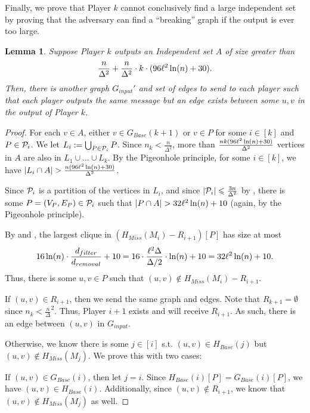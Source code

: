 \documentclass[11pt]{article}
\newtheorem{lemma}{Lemma}[section]
\theoremstyle{definition}
\renewcommand{\leq}{\leqslant}
\renewcommand{\le}{\leq}
\begin{document}
Finally, we prove that Player $k$ cannot conclusively find a large independent set by proving that the adversary can find a ``breaking'' graph if the output is ever too large. 

\begin{lemma}\label{find-breaking-element}
Suppose Player $k$ outputs an Independent set $A$ of size greater than 
\begin{align*}
    \frac{n}{\Delta^2}+\frac{n}{\Delta^2}\cdot k\cdot (96{\ell}^2\ln(n)+30).
\end{align*}
Then, there is another graph $G_{input}'$ and set of edges to send to each player such that each player outputs the same message but an edge exists between some $u, v$ in the output of Player $k$. 
\end{lemma}
\begin{proof}
For each $v\in A$, either $v\in G_{Base}(k+1)$ or $v\in P$ for some $i\in [k]$ and $P\in \mathcal{P}_i$. We let $L_i:=\bigcup_{P\in \mathcal{P}_i}P$. Since $n_k<\frac n{\Delta^2}$, more than $\frac{nk(96{\ell}^2\ln(n)+30)}{\Delta^2}$ vertices in $A$ are also in $L_1\cup\dots\cup L_k$. By the Pigeonhole principle, for some $i\in [k]$, we have $|L_i\cap A|>\frac{n(96{\distribFac}^2\ln (n) + 30)}{\Delta^2}$. 

Since $\mathcal{P}_i$ is a partition of the vertices in $L_i$, and since $|\CP_i|\le \frac{3n}{\Delta^2}$ by , there is some $P=(V_P, E_P)\in \mathcal{P}_i$ such that $|P\cap A|>32{\distribFac}^2\ln (n)+10$ (again, by the Pigeonhole principle).

By  and , the largest clique in $(H_{Miss}(M_i)-R_{i+1})[P]$ has size at most
\begin{align*}
16\ln(n)\cdot \frac{d_{filter}}{d_{removal}}+10=16\cdot \frac{{\ell}^2\Delta}{\Delta /2}\cdot \ln(n)+10=32{\ell}^2\ln(n)+10.
\end{align*}
Thus, there is some $u, v\in P$ such that $(u, v)\not\in H_{Miss}(M_i)-R_{i+1}$. 

If $(u, v)\in R_{i+1}$, then we send the same graph and edges. Note that $R_{k+1}=\emptyset$ since $n_k<\frac n{\Delta}^2$. Thus, Player $i+1$ exists and will receive $R_{i+1}$. As such, there is an edge between $(u, v)$ in $G_{input}$. 

Otherwise, we know there is some $j\in [i]$ s.t. $(u, v)\in H_{Base}(j)$ but $(u, v)\not\in H_{Miss}(M_j)$. We prove this with two cases:

If $(u, v)\in G_{Base}(i)$, then let $j=i$. Since $H_{Base}(i)[P]=G_{Base}(i)[P]$, we have $(u, v)\in H_{Base}(i)$. Additionally, since $(u, v)\not\in R_{i+1}$, we know that $(u, v)\not\in H_{Miss}(M_j)$ as well.


\end{proof}
\end{document}
